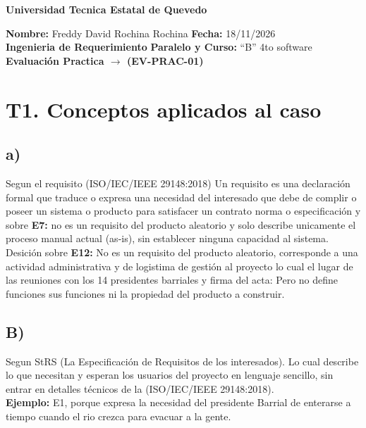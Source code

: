 \documentclass[11pt,a4paper]{article}
\begin{document}
	
	\begin{center}
		\textbf{\Large Universidad Tecnica Estatal de Quevedo}
	\end{center}
	
	\vspace{0.2cm}
	
	\noindent
	\textbf{Nombre:} Freddy David Rochina Rochina \hfill \textbf{Fecha:} 18/11/2026 \\
	\textbf{Ingenieria de Requerimiento} \hfill \textbf{Paralelo y Curso:} ``B'' 4to software \\
	\textbf{Evaluación Practica $\rightarrow$ (EV-PRAC-01)}
	
	\vspace{0.3cm}
	
	\noindent{}
	
	\vspace{0.4cm}
	
	\section*{T1. Conceptos aplicados al caso}
	
	\subsection*{a)}
	Segun el requisito (ISO/IEC/IEEE 29148:2018) Un requisito es una declaración formal que traduce o expresa una necesidad del interesado que debe de complir o poseer un sistema o producto para satisfacer un contrato norma o especificación y sobre \textbf{E7:} no es un requisito del producto aleatorio y solo describe unicamente el proceso manual actual (as-is), sin establecer ninguna capacidad al sistema. Desición sobre \textbf{E12:} No es un requisito del producto aleatorio, corresponde a una actividad administrativa y de logistima de gestión al proyecto lo cual el lugar de las reuniones con los 14 presidentes barriales y firma del acta: Pero no define funciones sus funciones ni la propiedad del producto a construir.
	
	\subsection*{B)}
	Segun StRS (La Especificación de Requisitos de los interesados). Lo cual describe lo que necesitan y esperan los usuarios del proyecto en lenguaje sencillo, sin entrar en detalles técnicos de la (ISO/IEC/IEEE 29148:2018). \\
	\textbf{Ejemplo:} E1, porque expresa la necesidad del presidente Barrial de enterarse a tiempo cuando el rio crezca para evacuar a la gente.
	
\end{document}
